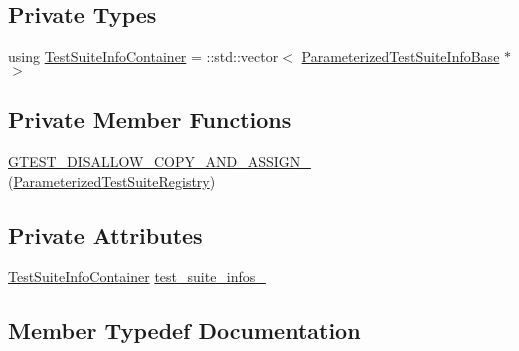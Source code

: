 \subsection*{Private Types}
\begin{DoxyCompactItemize}
\item 
using \hyperlink{classtesting_1_1internal_1_1ParameterizedTestSuiteRegistry_a39a8d3dfa91cb48329bfcf0853f0e72b}{Test\+Suite\+Info\+Container} = \+::std\+::vector$<$ \hyperlink{classtesting_1_1internal_1_1ParameterizedTestSuiteInfoBase}{Parameterized\+Test\+Suite\+Info\+Base} $\ast$ $>$
\end{DoxyCompactItemize}
\subsection*{Private Member Functions}
\begin{DoxyCompactItemize}
\item 
\hyperlink{classtesting_1_1internal_1_1ParameterizedTestSuiteRegistry_ac1454da4ff60ddeda6b4e60f1b6ce606}{G\+T\+E\+S\+T\+\_\+\+D\+I\+S\+A\+L\+L\+O\+W\+\_\+\+C\+O\+P\+Y\+\_\+\+A\+N\+D\+\_\+\+A\+S\+S\+I\+G\+N\+\_\+} (\hyperlink{classtesting_1_1internal_1_1ParameterizedTestSuiteRegistry}{Parameterized\+Test\+Suite\+Registry})
\end{DoxyCompactItemize}
\subsection*{Private Attributes}
\begin{DoxyCompactItemize}
\item 
\hyperlink{classtesting_1_1internal_1_1ParameterizedTestSuiteRegistry_a39a8d3dfa91cb48329bfcf0853f0e72b}{Test\+Suite\+Info\+Container} \hyperlink{classtesting_1_1internal_1_1ParameterizedTestSuiteRegistry_afb0271d017a518724a075986bd16c69c}{test\+\_\+suite\+\_\+infos\+\_\+}
\end{DoxyCompactItemize}


\subsection{Member Typedef Documentation}
\mbox{\label{classtesting_1_1internal_1_1ParameterizedTestSuiteRegistry_a39a8d3dfa91cb48329bfcf0853f0e72b}} 
